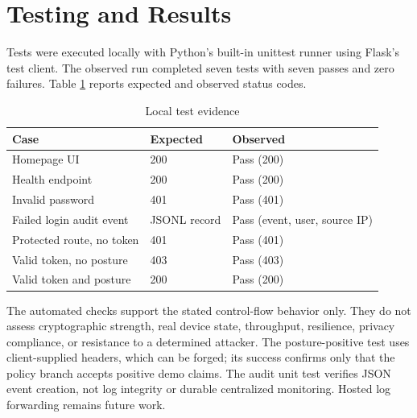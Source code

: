 \documentclass[conference]{IEEEtran}
\begin{document}
\section{Testing and Results}
Tests were executed locally with Python's built-in unittest runner using Flask's test client. The observed run completed seven tests with seven passes and zero failures. Table \ref{tab:tests} reports expected and observed status codes.
\begin{table}[ht]
\caption{Local test evidence}
\label{tab:tests}
\centering
\begin{tabular}{lll}
\toprule
Case & Expected & Observed\\
\midrule
Homepage UI & 200 & Pass (200)\\
Health endpoint & 200 & Pass (200)\\
Invalid password & 401 & Pass (401)\\
Failed login audit event & JSONL record & Pass (event, user, source IP)\\
Protected route, no token & 401 & Pass (401)\\
Valid token, no posture & 403 & Pass (403)\\
Valid token and posture & 200 & Pass (200)\\
\bottomrule
\end{tabular}
\end{table}
The automated checks support the stated control-flow behavior only. They do not assess cryptographic strength, real device state, throughput, resilience, privacy compliance, or resistance to a determined attacker. The posture-positive test uses client-supplied headers, which can be forged; its success confirms only that the policy branch accepts positive demo claims. The audit unit test verifies JSON event creation, not log integrity or durable centralized monitoring. Hosted log forwarding remains future work.
\end{document}
